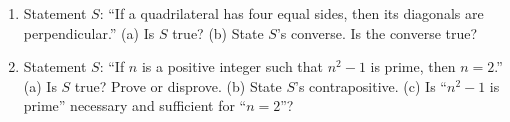 \documentclass[11pt,a4paper]{article}
\begin{document}
\begin{enumerate}
\item Statement $S$: ``If a quadrilateral has four equal sides, then its diagonals are perpendicular.'' (a) Is $S$ true? (b) State $S$'s converse. Is the converse true?

\item Statement $S$: ``If $n$ is a positive integer such that $n^2-1$ is prime, then $n=2$.'' (a) Is $S$ true? Prove or disprove. (b) State $S$'s contrapositive. (c) Is ``$n^2-1$ is prime'' necessary and sufficient for ``$n=2$''?

\end{enumerate}

\end{document}

